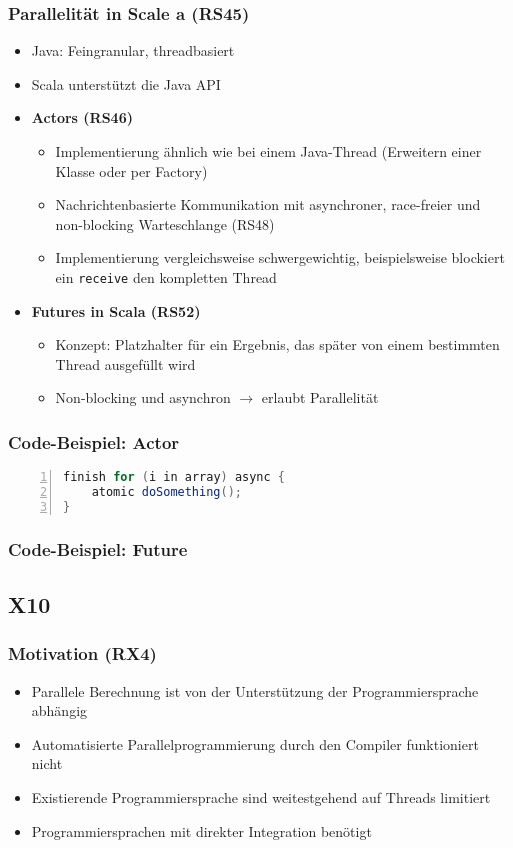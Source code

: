 \subsubsection{Parallelität in Scale
a (RS45)}
\begin{itemize}
	\item Java: Feingranular, threadbasiert
	\item Scala unterstützt die Java API
	\item \textbf{Actors (RS46)}
	\begin{itemize}
		\item Implementierung ähnlich wie bei einem Java-Thread (Erweitern einer Klasse oder per Factory)
		\item Nachrichtenbasierte Kommunikation mit asynchroner, race-freier und non-blocking Warteschlange (RS48)
		\item Implementierung vergleichsweise schwergewichtig, beispielsweise blockiert ein \texttt{receive} den kompletten Thread
	\end{itemize}
	\item \textbf{Futures in Scala (RS52)}
	\begin{itemize}
		\item Konzept: Platzhalter für ein Ergebnis, das später von einem bestimmten Thread ausgefüllt wird
		\item Non-blocking und asynchron \(\rightarrow\) erlaubt Parallelität
	\end{itemize}
\end{itemize}

\subsubsection{Code-Beispiel: Actor}
\begin{lstlisting}[frame=single,numbers=left,mathescape,language=Scala]
finish for (i in array) async {
	atomic doSomething();
}
\end{lstlisting}

\subsubsection{Code-Beispiel: Future}


\subsection{X10}

\subsubsection{Motivation (RX4)}
\begin{itemize}
	\item Parallele Berechnung ist von der Unterstützung der Programmiersprache abhängig
	\item Automatisierte Parallelprogrammierung durch den Compiler funktioniert nicht
	\item Existierende Programmiersprache sind weitestgehend auf Threads limitiert
	\item Programmiersprachen mit direkter Integration benötigt
\end{itemize}

